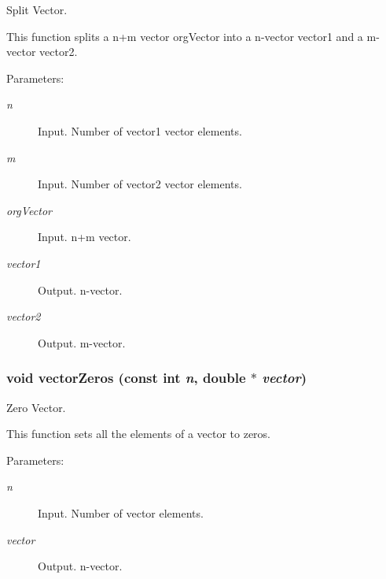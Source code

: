 Split Vector. 

This function splits a n+m vector orgVector into a n-vector vector1 and a m-vector vector2.

\begin{Desc}
\item[Parameters:]
\begin{description}
\item[{\em n}]Input. Number of vector1 vector elements. \item[{\em m}]Input. Number of vector2 vector elements. \item[{\em orgVector}]Input. n+m vector. \item[{\em vector1}]Output. n-vector. \item[{\em vector2}]Output. m-vector. \end{description}
\end{Desc}
\hypertarget{group__a_g36d84832e6a52057a4519e003d299e95}{
\subsubsection[vectorZeros]{\setlength{\rightskip}{0pt plus 5cm}void vectorZeros (const int {\em n}, \/  double $\ast$ {\em vector})}}
\label{group__a_g36d84832e6a52057a4519e003d299e95}


Zero Vector. 

This function sets all the elements of a vector to zeros.

\begin{Desc}
\item[Parameters:]
\begin{description}
\item[{\em n}]Input. Number of vector elements. \item[{\em vector}]Output. n-vector. \end{description}
\end{Desc}
